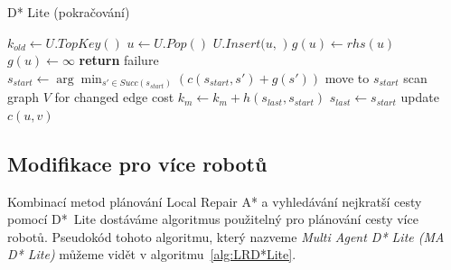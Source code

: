 \begin{algorithm}[H]
	\caption{D* Lite (pokračování)}
	\label{alg:DStarLiteP2}
	\begin{algorithmic}[1]
		\State $k_{old}\gets U.TopKey()$
		\State $u\gets U.Pop()$
		\State $U.Insert(u,$ $)$
		\State $g(u)\gets rhs(u)$
		\State {}
		\EndFor
		\Else
		\State $g(u)\gets \infty$
		\State {}
		\EndFor
		\EndIf
		\EndWhile
		\EndFunction
		\Statex
		\State {}
		\State {}
		\State \textbf{return} failure
		\EndIf
		\State $s_{start}\gets \arg\min_{s'\in Succ(s_{start})}(c(s_{start},s')+g(s'))$
		\State move to $s_{start}$
		\State scan graph $V$ for changed edge cost
		\State $k_m\gets k_m+h(s_{last},s_{start})$
		\State $s_{last}\gets s_{start}$
		\State update $c(u,v)$
		\State {}
		\EndFor
		\State {}
		\EndIf
		\EndWhile
		\EndFunction
	\end{algorithmic}
\end{algorithm}

\subsection{Modifikace pro více robotů}
Kombinací metod plánování Local Repair A* a vyhledávání nejkratší cesty pomocí D*~Lite dostáváme algoritmus použitelný pro plánování cesty více robotů. Pseudokód tohoto algoritmu, který nazveme \emph{Multi Agent D* Lite (MA D* Lite)} můžeme vidět v algoritmu~\ref{alg:LRD*Lite}.

